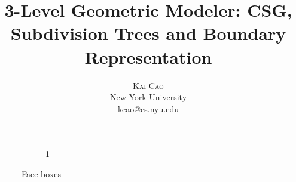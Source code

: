 \documentclass[twoside,twocolumn]{article}
\title{\vspace{-15mm}\fontsize{20pt}{10pt}\selectfont\textbf{3-Level Geometric Modeler: CSG, Subdivision Trees and Boundary Representation}} %
\author{
\large
\textsc{Kai Cao}\iffalse \thanks{Thanks to Chee Yap for his help}\fi \\[2mm] %
\normalsize New York University \\ %
\normalsize \href{mailto:kcao@cs.nyu.edu}{kcao@cs.nyu.edu} %
\vspace{-5mm}
}
\date{}
\begin{document}
\begin{comment}
\maketitle %

\thispagestyle{fancy} %


\begin{abstract}

\noindent The problem of computing geometry modeling in 3D is fundamental to computer graphics, path finding, motion planning and numerous branches of computer science. Given a polyhedron P defined by CSG (Constructive Solid Geometry) model, we raise a new idea to present the boundary features (vertices, edges and faces) of P using subdivision method; it has the following steps: 1) define a polyhedron P in CSG model, 2) predicate and subdivide a given box $B_0$ recursively until all sub-boxes are elementary 3) generate the adequate Subdivision Tree, 4) represent the boundary features based on the Subdivision Tree. Since the great generality and scalability of subdivision method, this idea can also be expanded to support more complex shape with higher order surfaces in 3D.

\end{abstract}
\end{comment}

\begin{figure}
        \centering
        \begin{subfigure}[b]{0.3\textwidth}
                \centering
					
                \caption{1}
                \label{fig:triangle}
        \end{subfigure}
		\begin{comment}
        \begin{subfigure}[b]{0.3\textwidth}
                \centering
				
                \caption{2}
                \label{fig:equitriangle}
        \end{subfigure}
        ~ %
        \begin{subfigure}[b]{0.3\textwidth}
                \centering
				
                \caption{3}
                \label{fig:trape}
        \end{subfigure}
		\end{comment}
        \caption{Face boxes}\label{fig:face}
\end{figure}
\end{document}
